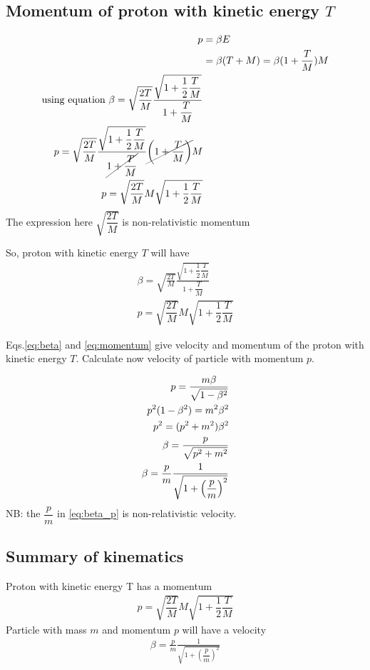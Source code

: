 \documentclass[english]{article}
\begin{document}
\subsection{Momentum of proton with kinetic energy $T$}

\begin{align*}
p &= \beta E \\
&= \beta (T+M) = \beta (1+\dfrac{T}{M})M \\ 
\text{using equation } \beta = \sqrt{\frac{2T}{M}} \frac{\sqrt{1 + \dfrac{1}{2}\dfrac{T}{M}}}{1+\dfrac{T}{M}} \\
p = \sqrt{\dfrac{2T}{M}} \frac{\sqrt{1+\dfrac{1}{2}\dfrac{T}{M}}}{\cancel{1+\dfrac{T}{M}}} \cancel{\left(1+\dfrac{T}{M}\right)} M \\
p = \sqrt{\dfrac{2T}{M}} M \sqrt{1 + \dfrac{1}{2}\dfrac{T}{M}}
\end{align*}
The expression here $\sqrt{\dfrac{2T}{M}}$ is non-relativistic momentum

So, proton with kinetic energy $T$ will have 
\begin{align}
\beta = \sqrt{\frac{2T}{M}} \frac{\sqrt{1 + \dfrac{1}{2}\dfrac{T}{M}}}{1+\dfrac{T}{M}} \label{eq:beta} \\ 
p = \sqrt{\dfrac{2T}{M}} M \sqrt{1 + \dfrac{1}{2}\dfrac{T}{M}} \label{eq:momentum}
\end{align}

Eqs.\eqref{eq:beta} and \eqref{eq:momentum} give velocity and momentum of the proton with kinetic energy $T$. 
Calculate now velocity of particle with momentum $p$.

\begin{align}
p = \frac{m\beta}{\sqrt{1-\beta^2}} \notag \\ 
p^2(1-\beta^2) = m^2\beta^2 \notag \\ 
p^2 = (p^2+m^2)\beta^2 \notag \\ 
\beta = \frac{p}{\sqrt{p^2+m^2}} \notag \\ 
\beta = \frac{p}{m} \frac{1}{\sqrt{1+\left(\dfrac{p}{m}\right)^2}} \label{eq:beta_p}
\end{align}
NB: the $\dfrac{p}{m}$ in \eqref{eq:beta_p} is non-relativistic velocity. 

\subsection{Summary of kinematics}

Proton with kinetic energy T has a momentum 
\begin{align*}
p = \sqrt{\dfrac{2T}{M}} M \sqrt{1 + \dfrac{1}{2}\dfrac{T}{M}}
\end{align*}
Particle with mass $m$ and momentum $p$ will have a velocity
\begin{align*}
\beta = \frac{p}{m} \frac{1}{\sqrt{1+\left(\dfrac{p}{m}\right)^2}} 
\end{align*}
\end{document}
